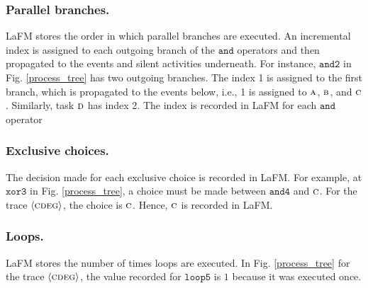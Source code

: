 \documentclass[runningheads]{llncs}
\begin{document}
\subsubsection{Parallel branches.} LaFM stores the order in which parallel branches are executed. An incremental index is assigned to each outgoing branch of the $\texttt{and}$ operators and then propagated to the events and silent activities underneath. For instance, $\texttt{and2}$ in Fig. \ref{process_tree} has two outgoing branches. The index 1 is assigned to the first branch, which is propagated to the events below, i.e., 1 is assigned to $\textsc{a}$, $\textsc{b}$, and $\textsc{c}$. Similarly, task $\textsc{d}$ has index 2. The index is recorded in LaFM for each $\texttt{and}$ operator


\subsubsection{Exclusive choices.} The decision made for each exclusive choice is recorded in LaFM. For example, at $\texttt{xor3}$ in Fig. \ref{process_tree}, a choice must be made between $\texttt{and4}$ and $\textsc{c}$. For the trace $\langle \textsc{cdeg} \rangle$, the choice is $\textsc{c}$. Hence, $\textsc{c}$ is recorded in LaFM.

\subsubsection{Loops.} LaFM stores the number of times loops are executed. In Fig. \ref{process_tree} for the trace $\langle \textsc{cdeg} \rangle$, the value recorded for $\texttt{loop5}$ is $1$ because it was executed once.
\end{document}
